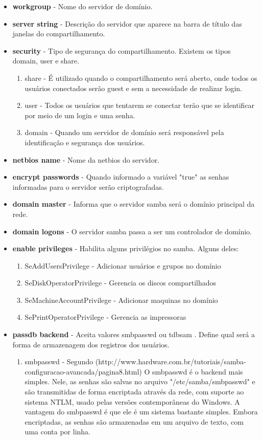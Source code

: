 \begin{itemize}
	\item \textbf{workgroup} - Nome do servidor de domínio.
	\item \textbf{server string} - Descrição do servidor que aparece na barra de título das janelas do compartilhamento.
	\item \textbf{security} - Tipo de segurança do compartilhamento. Existem os tipos domain, user e share.
		\begin{enumerate}
			\item {share}  - É utilizado quando o compartilhamento será aberto, onde todos os usuários conectados serão guest e sem a necessidade de realizar login.
			\item {user} - Todos os usuários que tentarem se conectar terão que se identificar por meio de um login e uma senha.
			\item {domain} - Quando um servidor de domínio será responsável pela identificação e segurança dos usuários.
		\end{enumerate} 
	\item \textbf{netbios name} - Nome da netbios do servidor.
	\item \textbf{encrypt passwords} - Quando informado a variável "true" as senhas informadas para o servidor serão criptografadas.
	\item \textbf{domain master} - Informa que o servidor samba será o domínio principal da rede.
	\item \textbf{domain logons} - O servidor samba passa a ser um controlador de domínio.
	\item \textbf{enable privileges} - Habilita alguns privilégios no samba. Alguns deles:
		\begin{enumerate}
			\item {SeAddUsersPrivilege} - Adicionar usuários e grupos no domínio 
			\item {SeDiskOperatorPrivilege} - Gerencia os discos compartilhados 
			\item {SeMachineAccountPrivilege} - Adicionar maquinas no domínio 
			\item {SePrintOperatorPrivilege} - Gerencia as impressoras
		\end{enumerate}
	\item \textbf{passdb backend} - Aceita valores smbpasswd ou tdbsam . Define qual será a forma de armazenagem dos registros dos usuários.
		\begin{enumerate}
			\item{smbpasswd} - Segundo (http://www.hardware.com.br/tutoriais/samba-configuracao-avancada/pagina8.html) O smbpasswd é o backend mais simples. Nele, as senhas são salvas no arquivo "/etc/samba/smbpasswd" e são transmitidas de forma encriptada através da rede, com suporte ao sistema NTLM, usado pelas versões contemporâneas do Windows. A vantagem do smbpasswd é que ele é um sistema bastante simples. Embora encriptadas, as senhas são armazenadas em um arquivo de texto, com uma conta por linha.

\end{enumerate}
\end{itemize}
